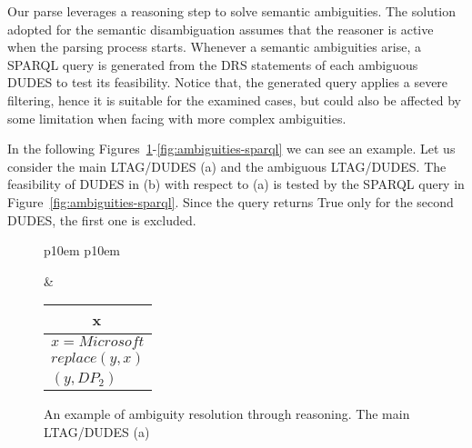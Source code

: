 Our parse leverages a reasoning step to solve semantic ambiguities.
%
The solution adopted for the semantic disambiguation assumes that the reasoner is active when the parsing process starts. 
%
Whenever a semantic ambiguities arise, a SPARQL query is generated from the DRS statements of each ambiguous DUDES to test its feasibility.
%
Notice that, the generated query applies a severe filtering, hence it is suitable for the examined cases, but could also be affected by some limitation when facing with more complex ambiguities.

In the following Figures~\ref{fig:ambiguities-resolution-a}-\ref{fig:ambiguities-sparql} we can see an example.
%
Let us consider the main LTAG/DUDES (a) and the ambiguous LTAG/DUDES.
%
The feasibility of DUDES in (b) with respect to (a) is tested by the SPARQL query in Figure~\ref{fig:ambiguities-sparql}. Since the query returns True only for the second DUDES, the first one is excluded.

\begin{figure}[tp]

\label{fig:ambiguities-resolution-a}
\begin{tabular}{ p{10em} p{10em} }
	\begin{center}
	\begin{tikzpicture}
	\Tree [.S [.VP [.V is ] [.DP$_1$ Microsoft ] ] [.DP$_2\downarrow$ ] ]
	\end{tikzpicture}
	\end{center}		
	&
	\begin{center}
	\begin{tabular}{|c|l|}
		\hline
		\mbox{} & x \\ 
		\hline
		\multicolumn{2}{|l|}{
			$x=Microsoft$
		}\\
		\multicolumn{2}{|l|}{
			$replace(y,x)$
		}\\
		\hline
		\multicolumn{2}{|l|}{
			\mbox{$(y,DP_2)$}
		}\\
		\hline
	\end{tabular}
	\end{center}
\end{tabular}
\caption{An example of ambiguity resolution through reasoning. The main LTAG/DUDES (a)}
\end{figure}


